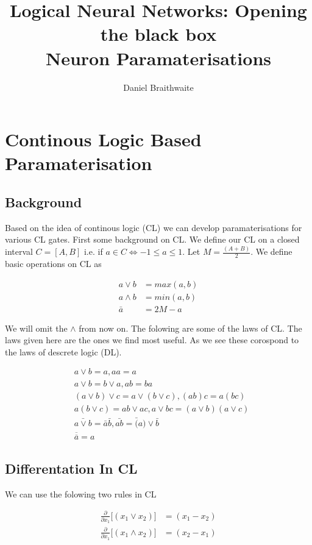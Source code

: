 \documentclass{article}
\title{%
	Logical Neural Networks: Opening the black box\\
	\large Neuron Paramaterisations
}
\author{Daniel Braithwaite}
\begin{document}
\maketitle

\section{Continous Logic Based Paramaterisation}
\subsection{Background}
Based on the idea of continous logic (CL) \cite{basicConceptsCL} we can develop paramaterisations for various CL gates. First some background on CL. We define our CL on a closed interval $C = [A, B]$ i.e. if $a \in C \iff -1 \leq a \leq 1$. Let  $M = \frac{(A + B)}{2}$. We define basic operations on CL as 

\begin{align}
a \lor b &= max(a, b) \\
a \land b &= min(a, b) \\
\bar{a} &= 2M - a
\end{align}

We will omit the $\land$ from now on. The folowing are some of the laws of CL. The laws given here are the ones we find most useful. As we see these corospond to the laws of descrete logic (DL).

\begin{align}
& a \lor b = a, aa = a \\
& a \lor b = b \lor a, ab = ba \\
& (a \lor b) \lor c = a \lor (b \lor c), (ab)c = a(bc) \\
& a(b \lor c) = ab \lor ac, a \lor bc = (a \lor b)(a \lor c) \\
& \bar{a \lor b} = \bar{a}\bar{b}, \bar{ab} = \bar(a) \lor \bar{b} \\
& \overline{\overline{a}} = a
\end{align}

\subsection{Differentation In CL}
We can use the folowing two rules in CL

\begin{align}
\frac{\partial}{\partial x_1} \bigg[ (x_1 \lor x_2) \bigg] &= (x_1 - x_2)\\
\frac{\partial}{\partial x_1} \bigg[ (x_1 \land x_2) \bigg] &= (x_2 - x_1)
\end{align}
\end{document}
